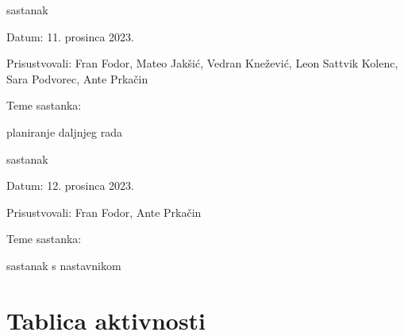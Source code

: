 \begin{packed_enum}
			\item  sastanak
			\item[] \begin{packed_item}
				\item Datum: {11. prosinca 2023.}
				\item Prisustvovali: {Fran Fodor, Mateo Jakšić, Vedran Knežević, Leon Sattvik Kolenc, Sara Podvorec, Ante Prkačin}
				\item Teme sastanka:
				\begin{packed_item}
					\item  planiranje daljnjeg rada
				\end{packed_item}
			\end{packed_item}

			\item  sastanak
			\item[] \begin{packed_item}
				\item Datum: {12. prosinca 2023.}
				\item Prisustvovali: {Fran Fodor, Ante Prkačin}
				\item Teme sastanka:
				\begin{packed_item}
					\item  sastanak s nastavnikom
				\end{packed_item}
			\end{packed_item}

			
		\end{packed_enum}
		
		\eject
		\section*{Tablica aktivnosti}
		
